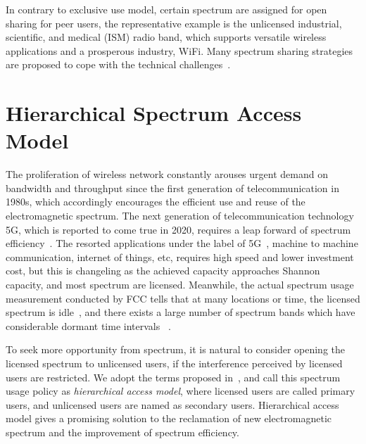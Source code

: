 %
In contrary to exclusive use model, certain spectrum are assigned for open sharing for peer users, the representative example is the unlicensed industrial, scientific, and medical (ISM) radio band, which supports versatile wireless applications and a prosperous industry, \ie WiFi.
Many spectrum sharing strategies are proposed to cope with the technical challenges~\cite{Ko_DistributedCA}.

\section{Hierarchical Spectrum Access Model}
\label{hierarchical}
The proliferation of wireless network constantly arouses urgent demand on bandwidth and throughput since the first generation of telecommunication in 1980s, which accordingly encourages the efficient use and reuse of the electromagnetic spectrum.
The next generation of telecommunication technology 5G, which is reported to come true in 2020, requires a leap forward of spectrum efficiency~\cite{5G_2014}.
The resorted applications under the label of 5G~\cite{5directions5G_2014}, \ie machine to machine communication, internet of things, etc, requires high speed and lower investment cost, but this is changeling as the achieved capacity approaches Shannon capacity, and most spectrum are licensed.
Meanwhile, the actual spectrum usage measurement conducted by FCC tells that at many locations or time, the licensed spectrum is idle~\cite{FCC_spectrumEfficiency_2002}, and there exists a large number of spectrum bands which have considerable dormant time intervals ~\cite{Akyildiz06survey}.


To seek more opportunity from spectrum, it is natural to consider opening the licensed spectrum to unlicensed users, if the interference perceived by licensed users are restricted.
We adopt the terms proposed in~\cite{zhao_survey_DSA_2007}, and call this spectrum usage policy as \textit{hierarchical access model}, where licensed users are called primary users, and unlicensed users are named as secondary users.
Hierarchical access model gives a promising solution to the reclamation of new electromagnetic spectrum and the improvement of spectrum efficiency.

